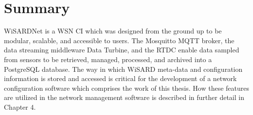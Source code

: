 \section{Summary}
WiSARDNet is a WSN CI which was designed from the ground up to be modular, scalable, and accessible to users. The Mosquitto MQTT broker, the data streaming middleware Data Turbine, and the RTDC enable data sampled from sensors to be retrieved, managed, processed, and archived into a PostgreSQL database. The way in which WiSARD meta-data and configuration information is stored and accessed is critical for the development of a network configuration software which comprises the work of this thesis. How these features are utilized in the network management software is described in further detail in Chapter 4.